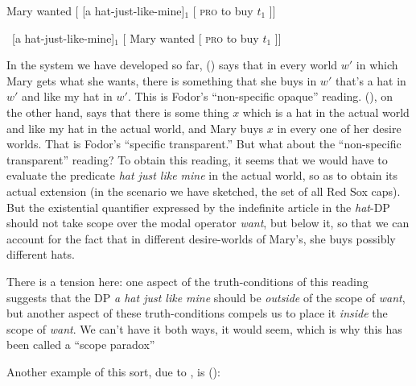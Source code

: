 \ex Mary wanted [ [a hat-just-like-mine]$_{1}$ [ \textsc{pro} to buy $t_{1}$ ]] \xe

\ex\ [a hat-just-like-mine]$_{1}$ [ Mary wanted [ \textsc{pro} to buy $t_{1}$ ]] \xe

In the system we have developed so far, (\blastx) says that in every world $w'$
in which Mary gets what she wants, there is something that she buys in $w'$
that's a hat in $w'$ and like my hat in $w'$. This is Fodor's ``non-specific
opaque'' reading. (\lastx), on the other hand, says that there is some thing $x$
which is a hat in the actual world and like my hat in the actual world, and Mary
buys $x$ in every one of her desire worlds. That is Fodor's ``specific
transparent.'' But what about the ``non-specific transparent'' reading? To
obtain this reading, it seems that we would have to evaluate the predicate
\emph{hat just like mine} in the actual world, so as to obtain its actual
extension (in the scenario we have sketched, the set of all Red Sox caps). But
the existential quantifier expressed by the indefinite article in the
\emph{hat}-DP should not take scope over the modal operator \emph{want}, but
below it, so that we can account for the fact that in different desire-worlds of
Mary's, she buys possibly different hats.

There is a tension here: one aspect of the truth-conditions of this reading
suggests that the DP \emph{a hat just like mine} should be \emph{outside} of the
scope of \emph{want}, but another aspect of these truth-conditions compels us to
place it \emph{inside} the scope of \emph{want}. We can't have it both ways, it
would seem, which is why this has been called a ``scope paradox''

Another example of this sort, due to \citet{bauerle:1983:nps}, is (\nextx):

